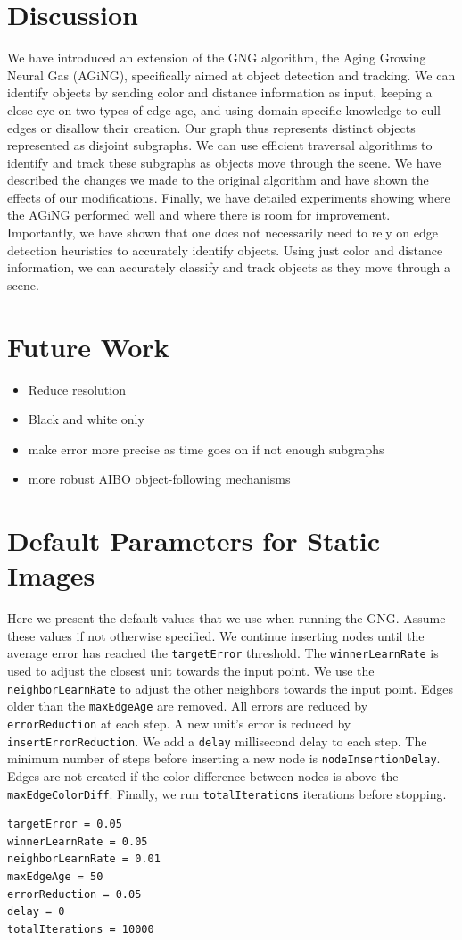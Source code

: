 \documentclass{article}
\renewcommand{\|}{\origbar} %
\begin{document}
\section{Discussion}
\label{sec:discussion}

We have introduced an extension of the GNG algorithm, the Aging Growing Neural Gas (AGiNG), specifically aimed at  object detection and tracking. We can identify objects by sending color and distance information as input, keeping a close eye on two types of edge age, and using domain-specific knowledge to cull edges or disallow their creation. Our graph thus represents distinct objects represented as disjoint subgraphs. We can use efficient traversal algorithms to identify and track these subgraphs as objects move through the scene. We have described the changes we made to the original algorithm and have shown the effects of our modifications. Finally, we have detailed experiments showing where the AGiNG performed well and where there is room for improvement. Importantly, we have shown that one does not necessarily need to rely on edge detection heuristics to accurately identify objects. Using just color and distance information, we can accurately classify and track objects as they move through a scene.

\section{Future Work}
\label{sec:future}

\begin{itemize}
  \item Reduce resolution
  \item Black and white only
  \item make error more precise as time goes on if not enough subgraphs
  \item more robust AIBO object-following mechanisms
\end{itemize}




\appendix
\section{Default Parameters for Static Images}
\label{appendix:staticImgParams}

Here we present the default values that we use when running the GNG. Assume these values if not otherwise specified. We continue inserting nodes until the average error has reached the \verb+targetError+ threshold. The \verb+winnerLearnRate+ is used to adjust the closest unit towards the input point. We use the \verb+neighborLearnRate+ to adjust the other neighbors towards the input point. Edges older than the \verb+maxEdgeAge+ are removed. All errors are reduced by \verb+errorReduction+ at each step. A new unit's error is reduced by \verb+insertErrorReduction+. We add a \verb+delay+ millisecond delay to each step. The minimum number of steps before inserting a new node is \verb+nodeInsertionDelay+. Edges are not created if the color difference between nodes is above the \verb+maxEdgeColorDiff+. Finally, we run \verb+totalIterations+ iterations before stopping.

\begin{verbatim}
targetError = 0.05
winnerLearnRate = 0.05
neighborLearnRate = 0.01
maxEdgeAge = 50
errorReduction = 0.05
delay = 0
totalIterations = 10000
\end{verbatim}
\end{document}
